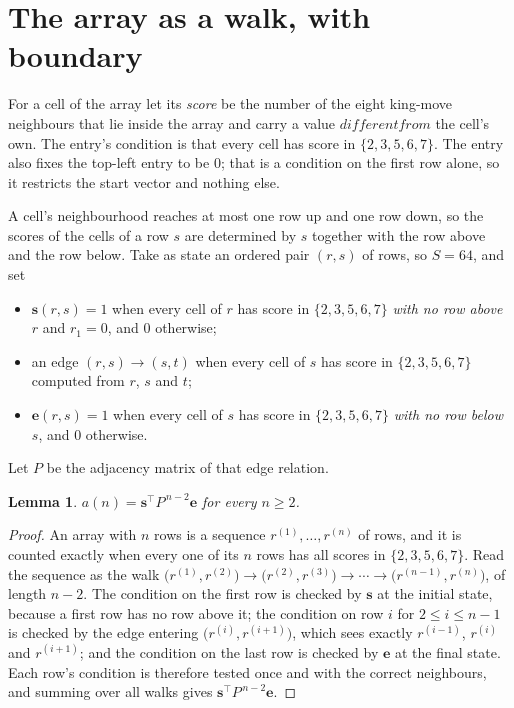 \documentclass[11pt,a4paper]{article}
\theoremstyle{plain}
\newtheorem{lemma}[theorem]{Lemma}
\theoremstyle{definition}
\begin{document}
\section{The array as a walk, with boundary}

For a cell of the array let its \emph{score} be the number of the eight king-move neighbours that lie inside
the array and carry a value $different from$ the cell's own. The entry's condition is that every cell
has score in $\{2,3,5,6,7\}$. The entry also fixes the top-left entry to be $0$; that is a condition on the first row alone, so it restricts the start vector and nothing else.

A cell's neighbourhood reaches at most one row up and one row down, so the scores of the
cells of a row $s$ are determined by $s$ together with the row above and the row below.
Take as state an ordered pair $(r,s)$ of rows, so $S=64$, and set
\begin{itemize}
\item $\mathbf{s}(r,s)=1$ when every cell of $r$ has score in $\{2,3,5,6,7\}$ \emph{with no row
above $r$} and $r_1=0$, and $0$ otherwise;
\item an edge $(r,s)\to(s,t)$ when every cell of $s$ has score in $\{2,3,5,6,7\}$ computed from
$r$, $s$ and $t$;
\item $\mathbf{e}(r,s)=1$ when every cell of $s$ has score in $\{2,3,5,6,7\}$ \emph{with no row
below $s$}, and $0$ otherwise.
\end{itemize}
Let $P$ be the adjacency matrix of that edge relation.

\begin{lemma}\label{lem:walk}
$a(n)=\mathbf{s}^{\!\top}P^{\,n-2}\mathbf{e}$ for every $n\ge2$.
\end{lemma}

\begin{proof}
An array with $n$ rows is a sequence $r^{(1)},\dots,r^{(n)}$ of rows, and it is counted
exactly when every one of its $n$ rows has all scores in $\{2,3,5,6,7\}$. Read the sequence as the
walk $\bigl(r^{(1)},r^{(2)}\bigr)\to\bigl(r^{(2)},r^{(3)}\bigr)\to\cdots\to
\bigl(r^{(n-1)},r^{(n)}\bigr)$, of length $n-2$. The condition on the first row is
checked by $\mathbf{s}$ at the initial state, because a first row has no row above it; the
condition on row $i$ for $2\le i\le n-1$ is checked by the edge entering
$\bigl(r^{(i)},r^{(i+1)}\bigr)$, which sees exactly $r^{(i-1)}$, $r^{(i)}$ and
$r^{(i+1)}$; and the condition on the last row is checked by $\mathbf{e}$ at the final
state. Each row's condition is therefore tested once and with the correct neighbours, and
summing over all walks gives $\mathbf{s}^{\!\top}P^{\,n-2}\mathbf{e}$.
\end{proof}
\end{document}
